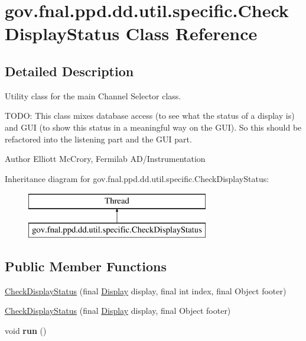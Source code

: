 \hypertarget{classgov_1_1fnal_1_1ppd_1_1dd_1_1util_1_1specific_1_1CheckDisplayStatus}{\section{gov.\-fnal.\-ppd.\-dd.\-util.\-specific.\-Check\-Display\-Status Class Reference}
\label{classgov_1_1fnal_1_1ppd_1_1dd_1_1util_1_1specific_1_1CheckDisplayStatus}
}


\subsection{Detailed Description}
Utility class for the main Channel Selector class.

T\-O\-D\-O\-: This class mixes database access (to see what the status of a display is) and G\-U\-I (to show this status in a meaningful way on the G\-U\-I). So this should be refactored into the listening part and the G\-U\-I part.

\begin{DoxyAuthor}{Author}
Elliott Mc\-Crory, Fermilab A\-D/\-Instrumentation 
\end{DoxyAuthor}
Inheritance diagram for gov.\-fnal.\-ppd.\-dd.\-util.\-specific.\-Check\-Display\-Status\-:\begin{figure}[H]
\begin{center}
\leavevmode
\includegraphics[height=2.000000cm]{classgov_1_1fnal_1_1ppd_1_1dd_1_1util_1_1specific_1_1CheckDisplayStatus}
\end{center}
\end{figure}
\subsection*{Public Member Functions}
\begin{DoxyCompactItemize}
\item 
\hyperlink{classgov_1_1fnal_1_1ppd_1_1dd_1_1util_1_1specific_1_1CheckDisplayStatus_a9b515eaa64b3c2f3527205876f262038}{Check\-Display\-Status} (final \hyperlink{interfacegov_1_1fnal_1_1ppd_1_1dd_1_1signage_1_1Display}{Display} display, final int index, final Object footer)
\item 
\hyperlink{classgov_1_1fnal_1_1ppd_1_1dd_1_1util_1_1specific_1_1CheckDisplayStatus_a71115f44f6b32092706ef07668d736b8}{Check\-Display\-Status} (final \hyperlink{interfacegov_1_1fnal_1_1ppd_1_1dd_1_1signage_1_1Display}{Display} display, final Object footer)
\item 
\hypertarget{classgov_1_1fnal_1_1ppd_1_1dd_1_1util_1_1specific_1_1CheckDisplayStatus_a763fb783cd33bd5160c3efcaad92a37b}{void {\bfseries run} ()}\label{classgov_1_1fnal_1_1ppd_1_1dd_1_1util_1_1specific_1_1CheckDisplayStatus_a763fb783cd33bd5160c3efcaad92a37b}

\end{DoxyCompactItemize}
